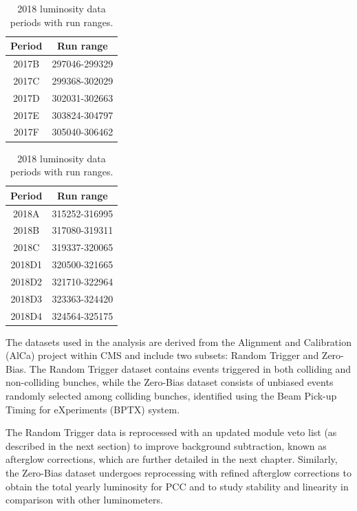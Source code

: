 \begin{table}[h!]
  \centering
  \begin{minipage}[t]{0.45\linewidth}
    \centering
    \caption[Run ranges for 2017 periods]{2017 luminosity data periods with run ranges.}
    \begin{tabular}{cc}
      \textbf{Period} & \textbf{Run range} \\ \hline
      2017B & 297046-299329 \\
      2017C & 299368-302029 \\
      2017D & 302031-302663 \\
      2017E & 303824-304797 \\
      2017F & 305040-306462 \\
    \end{tabular}
    \label{tab:period_run_ranges_2017}
  \end{minipage}%
  \hspace{0.05\linewidth} %
  \begin{minipage}[t]{0.45\linewidth}
    \centering
    \caption[Run ranges for 2018 periods]{2018 luminosity data periods with run ranges.}
    \begin{tabular}{cc}
      \textbf{Period} & \textbf{Run range} \\ \hline
      2018A & 315252-316995 \\
      2018B & 317080-319311 \\
      2018C & 319337-320065 \\
      2018D1 & 320500-321665 \\
      2018D2 & 321710-322964 \\
      2018D3 & 323363-324420 \\
      2018D4 & 324564-325175 \\
    \end{tabular}
    \label{tab:period_run_ranges_2018}
  \end{minipage}
\end{table}


The datasets used in the analysis are derived from the Alignment and Calibration (AlCa) project within CMS and include two subsets: Random Trigger and Zero-Bias. The Random Trigger dataset contains events triggered in both colliding and non-colliding bunches, while the Zero-Bias dataset consists of unbiased events randomly selected among colliding bunches, identified using the Beam Pick-up Timing for eXperiments (BPTX) system.

The Random Trigger data is reprocessed with an updated module veto list (as described in the next section) to improve background subtraction, known as afterglow corrections, which are further detailed in the next chapter. Similarly, the Zero-Bias dataset undergoes reprocessing with refined afterglow corrections to obtain the total yearly luminosity for PCC and to study stability and linearity in comparison with other luminometers.

